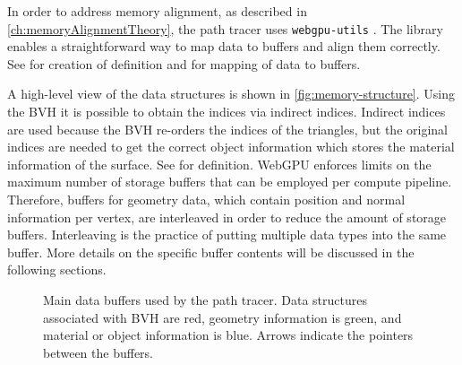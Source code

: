 In order to address memory alignment, as described in \autoref{ch:memoryAlignmentTheory}, the path tracer uses \texttt{webgpu-utils} \cite{webgpuUtilsLib}. The library enables a straightforward way to map data to buffers and align them correctly. See  for creation of definition and  for mapping of data to buffers.

A high-level view of the data structures is shown in \autoref{fig:memory-structure}. Using the \gls{BVH} it is possible to obtain the indices via indirect indices. Indirect indices are used because the \gls{BVH} re-orders the indices of the triangles, but the original indices are needed to get the correct object information which stores the material information of the surface. See  for definition. \gls{WebGPU} enforces limits on the maximum number of storage buffers that can be employed per compute pipeline. Therefore, buffers for geometry data, which contain position and normal information per vertex, are interleaved in order to reduce the amount of storage buffers. Interleaving is the practice of putting multiple data types into the same buffer. More details on the specific buffer contents will be discussed in the following sections.

\begin{figure}[H]
    \centering
    \caption{Main data buffers used by the path tracer. Data structures associated with \gls{BVH} are red, geometry information is green, and material or object information is blue. Arrows indicate the pointers between the buffers.}
    \label{fig:memory-structure}
  \end{figure}

